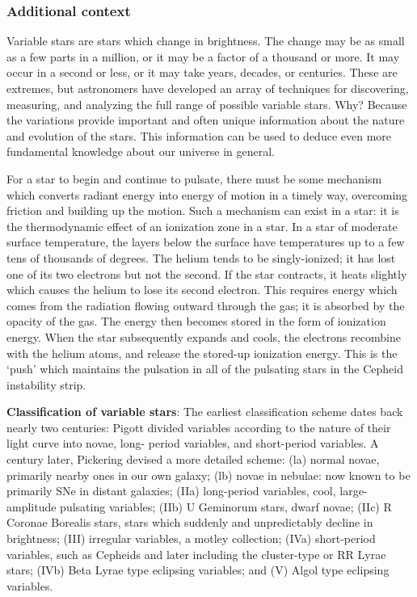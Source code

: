 \documentclass[a4paper,10pt]{article}
\begin{document}
\subsubsection{Additional context}

{\noindent}Variable stars are stars which change in brightness. The change may be as small as a few parts in a million, or it may be a factor of a thousand or more. It may occur in a second or less, or it may take years, decades, or centuries. These are extremes, but astronomers have developed an array of techniques for discovering, measuring, and analyzing the full range of possible variable stars. Why? Because the variations provide important and often unique information about the nature and evolution of the stars. This information can be used to deduce even more fundamental knowledge about our universe in general.

{\noindent}For a star to begin and continue to pulsate, there must be some mechanism which converts radiant energy into energy of motion in a timely way, overcoming friction and building up the motion. Such a mechanism can exist in a star: it is the thermodynamic effect of an ionization zone in a star. In a star of moderate surface temperature, the layers below the surface have temperatures up to a few tens of thousands of degrees. The helium tends to be singly-ionized; it has lost one of its two electrons but not the second. If the star contracts, it heats slightly which causes the helium to lose its second electron. This requires energy which comes from the radiation flowing outward through the gas; it is absorbed by the opacity of the gas. The energy then becomes stored in the form of ionization energy. When the star subsequently expands and cools, the electrons recombine with the helium atoms, and release the stored-up ionization energy. This is the `push' which maintains the pulsation in all of the pulsating stars in the Cepheid instability strip.

{\noindent}\textbf{Classification of variable stars}: The earliest classification scheme dates back nearly two centuries: Pigott divided variables according to the nature of their light curve into novae, long- period variables, and short-period variables. A century later, Pickering devised a more detailed scheme: (la) normal novae, primarily nearby ones in our own galaxy; (lb) novae in nebulae: now known to be primarily SNe in distant galaxies; (IIa) long-period variables, cool, large-amplitude pulsating variables; (IIb) U Geminorum stars, dwarf novae; (IIc) R Coronae Borealis stars, stars which suddenly and unpredictably decline in brightness; (III) irregular variables, a motley collection; (IVa) short-period variables, such as Cepheids and later including the cluster-type or RR Lyrae stars; (IVb) Beta Lyrae type eclipsing variables; and (V) Algol type eclipsing variables.
\end{document}
